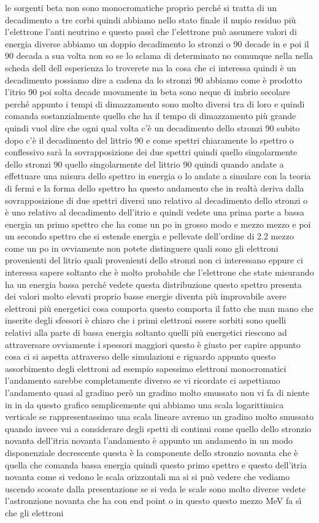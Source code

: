 {le sorgenti beta non sono monocromatiche proprio perché si tratta di un decadimento a tre corbi quindi abbiamo nello stato finale il nupio residuo più l'elettrone l'anti neutrino e questo passì che l'elettrone può assumere valori di energia diverse abbiamo un doppio decadimento lo stronzi o 90 decade in e poi il 90 decada a sua volta non so se lo sclama di determinato no comunque nella nella scheda dell dell esperienza lo troverete ma la cosa che ci interessa quindi è un decadimento possiamo dire a cadena da lo stronzi 90 abbiamo come è prodotto l'itrio 90 poi solta decade nuovamente in beta sono neque di imbrio secolare perché appunto i tempi di dimazzamento sono molto diversi tra di loro e quindi comanda sostanzialmente quello che ha il tempo di dimazzamento più grande quindi vuol dire che ogni qual volta c'è un decadimento dello stronzi 90 subito dopo c'è il decadimento del littrio 90 e come spettri chiaramente lo spettro o conflessivo sarà la sovrapposizione dei due spettri quindi quello singolarmente dello stronzi 90 quello singolarmente del littrio 90 quindi quando andate a effettuare una misura dello spettro in energia o lo andate a simulare con la teoria di fermi e la forma dello spettro ha questo andamento che in realtà deriva dalla sovrapposizione di due spettri diversi uno relativo al decadimento dello stronzi o è uno relativo al decadimento dell'itrio e quindi vedete una prima parte a bassa energia un primo spettro che ha come un po in grosso modo e mezzo mezzo e poi un secondo spettro che si estende energia e pellevate dell'ordine di 2.2 mezzo come un po in ovviamente non potete distinguere quali sono gli elettroni provenienti del litrio quali provenienti dello stronzi non ci interessano eppure ci interessa sapere soltanto che è molto probabile che l'elettrone che state misurando ha un energia bassa perché vedete questa distribuzione questo spettro presenta dei valori molto elevati proprio basse energie diventa più improvabile avere elettroni più energetici cosa comporta questo comporta il fatto che man mano che inserite degli sfessori è chiaro che i primi elettroni essere sorbiti sono quelli relativi alla parte di bassa energia soltanto quelli più energetici riescono ad attraversare ovviamente i spessori maggiori questo è giusto per capire appunto cosa ci si aspetta attraverso delle simulazioni e riguardo appunto questo assorbimento degli elettroni ad esempio sapessimo elettroni monocromatici l'andamento sarebbe completamente diverso se vi ricordate ci aspettiamo l'andamento quasi al gradino però un gradino molto smussato non vi fa di niente in in da questo grafico semplicemente qui abbiamo una scala logarittimica verticale se rappresentassimo una scala lineare avremo un gradino molto smussato quando invece vai a considerare degli spetti di continui come quello dello stronzio novanta dell'itria novanta l'andamento è appunto un andamento in un modo disponenziale decrescente questa è la componente dello stronzio novanta che è quella che comanda bassa energia quindi questo primo spettro e questo dell'itria novanta come si vedono le scala orizzontali ma si si può vedere che vediamo uscendo scosate dalla presentazione se si veda le scale sono molto diverse vedete l'astronzione novanta che ha con end point o in questo questo mezzo MeV fa sì che gli elettroni }
